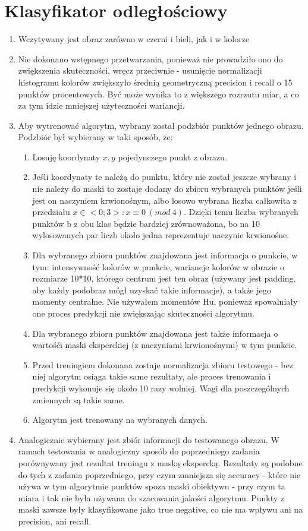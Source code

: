 \documentclass[12pt]{article}
\begin{document}
\section{Klasyfikator odległościowy}
\begin{enumerate}
	\item Wczytywany jest obraz zarówno w czerni i bieli, jak i w kolorze
	\item Nie dokonano wstępnego przetwarzania, ponieważ nie prowadziło ono do zwiększenia skuteczności, wręcz przeciwnie - usunięcie normalizacji histogramu kolorów zwiększyło średnią geometryczną precision i recall o 15 punktów procentowych. Być może wynika to z większego rozrzutu miar, a co za tym idzie mniejszej użyteczności wariancji.
	\item Aby wytrenować algorytm, wybrany został podzbiór punktów jednego obrazu. Podzbiór był wybierany w taki sposób, że:
	\begin{enumerate}
		\item Losuję koordynaty \(x, y\) pojedynczego punkt z obrazu.
		\item Jeśli koordynaty te należą do punktu, który nie został jeszcze wybrany i nie należy do maski to zostaje dodany do zbioru wybranych punktów jeśli jest on naczyniem krwionośnym, albo losowo wybrana liczba całkowita z przedziału \(x \in <0;3>: x \equiv 0\ (mod\ 4)\). Dzięki temu liczba wybranych punktów b z obu klas będzie bardziej zrównoważona, bo na 10 wylosowanych par liczb około jedna reprezentuje naczynie krwionośne.
		\item Dla wybranego zbioru punktów znajdowana jest informacja o punkcie, w tym: intensywność kolorów w punkcie, wariancje kolorów w obrazie o rozmiarze 10*10, którego centrum jest ten obraz (używany jest padding, aby każdy podobraz mógł uzyskać takie informacje), a także jego momenty centralne. Nie używałem momentów Hu, ponieważ spowalniały one proces predykcji nie zwiększając skuteczności algorytmu.
		\item Dla wybranego zbioru punktów znajdowana jest także informacja o wartośći maski eksperckiej (z naczyniami krwionośnymi) w tym punkcie.
		\item Przed treningiem dokonana zostaje normalizacja zbioru testowego - bez niej algorytm osiąga takie same rezultaty, ale proces trenowania i predykcji wykonuje się około 10 razy wolniej. Wagi dla poszczególnych zmiennych są takie same.
		\item Algorytm jest trenowany na wybranych danych.
	\end{enumerate}
	\item Analogicznie wybierany jest zbiór informacji do testowanego obrazu. W ramach testowania w analogiczny sposób do poprzedniego zadania porównywany jest rezultat treningu z maską ekspercką. Rezultaty są podobne do tych z zadania poprzedniego, przy czym zmniejsza się accuracy - które nie używa w tym algorytmie punktów spoza maski  obiektywu - przy czym ta miara i tak nie była używana do szacowania jakości algorytmu. Punkty z maski zawsze były klasyfikowane jako true negative, co nie ma wpływu ani na precision, ani recall.
\end{enumerate}
\end{document}
